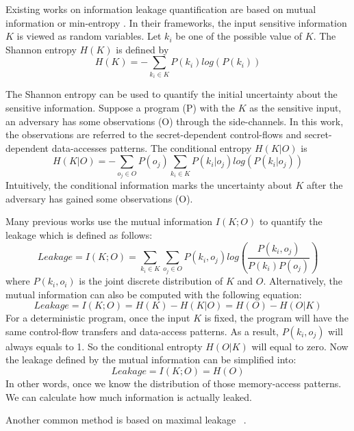 Existing works on information leakage quantification are based on mutual information or 
min-entropy \cite{10.1007/978-3-642-00596-1_21}.
In their frameworks, the input sensitive
information $K$ is viewed as random variables. Let $k_i$ be one of the possible
value of $K$. The Shannon entropy $H(K)$ is defined by
\begin{equation}
    H(K) = - \sum_{k_i {\in} K}P(k_i)log(P(k_i))
\end{equation}

The Shannon entropy can be used to quantify the initial uncertainty about the sensitive
information. Suppose a program (P) with the $K$ as
the sensitive input, an adversary has some observations (O) through the side-channels.
In this work, the observations are referred to the secret-dependent control-flows and
secret-dependent data-accesses patterns. The conditional entropy $H(K|O)$ is
\begin{equation}
    H(K|O) = - \sum_{o_j {\in} O} {P(o_j) \sum_{k_i {\in} K}{P(k_i|o_j)log(P(k_i|o_j))}}
\end{equation}
Intuitively, the conditional information marks the uncertainty about $K$ after the adversary
has gained some observations (O). 

Many previous works use the mutual information $I(K; O)$ to quantify the leakage which is defined 
as follows:
\begin{equation}
    Leakage = I(K;O) = \sum_{k_i {\in} K}{\sum_{o_j {\in} O}{P(k_i, o_j)log(\frac{P(k_i, o_j)}{P(k_i)P(o_j)})}}
\end{equation}
where $P(k_i, o_i)$ is the joint discrete distribution of $K$ and $O$.
Alternatively, the mutual information can also be computed with the following equation:
\begin{equation}
    Leakage = I(K;O) = H(K) - H(K|O) = H(O) - H(O|K)
\end{equation} 
For a deterministic program, once the input $K$ is fixed, the program will have the same
control-flow transfers and data-access patterns. As a result, $P(k_i, o_j)$ will always
equals to 1. So the conditional entropty $H(O|K)$ will equal to zero. Now the leakage defined
by the mutual information can be simplified into:
\begin{equation}
    Leakage = I(K;O) = H(O)
\end{equation}
In other words, once we know the distribution of those memory-access patterns. We can 
calculate how much information is actually leaked.

Another common method is based on maximal leakage ~\cite{10.1007/978-3-642-00596-1_21,10.1007/978-3-642-31424-7_40,182946}.

